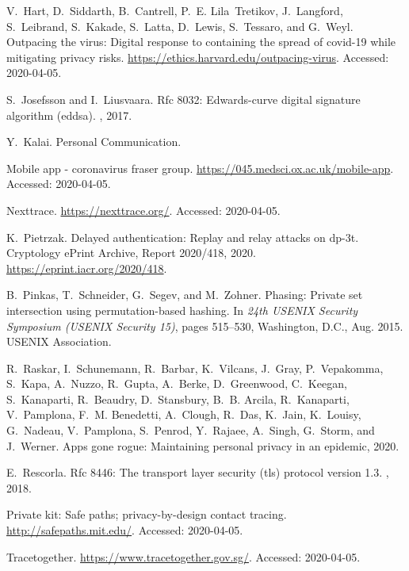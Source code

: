 \begin{thebibliography}{10}
V.~Hart, D.~Siddarth, B.~Cantrell, P.~E. Lila~Tretikov, J.~Langford,
  S.~Leibrand, S.~Kakade, S.~Latta, D.~Lewis, S.~Tessaro, and G.~Weyl.
\newblock Outpacing the virus: Digital response to containing the spread of
  covid-19 while mitigating privacy risks.
\newblock \url{https://ethics.harvard.edu/outpacing-virus}.
\newblock Accessed: 2020-04-05.

S.~Josefsson and I.~Liusvaara.
\newblock Rfc 8032: Edwards-curve digital signature algorithm (eddsa).
, 2017.

Y.~Kalai.
\newblock Personal Communication.

Mobile app - coronavirus fraser group.
\newblock \url{https://045.medsci.ox.ac.uk/mobile-app}.
\newblock Accessed: 2020-04-05.

Nexttrace.
\newblock \url{https://nexttrace.org/}.
\newblock Accessed: 2020-04-05.

K.~Pietrzak.
\newblock Delayed authentication: Replay and relay attacks on dp-3t.
\newblock Cryptology ePrint Archive, Report 2020/418, 2020.
\newblock \url{https://eprint.iacr.org/2020/418}.

B.~Pinkas, T.~Schneider, G.~Segev, and M.~Zohner.
\newblock Phasing: Private set intersection using permutation-based hashing.
\newblock In {\em 24th {USENIX} Security Symposium ({USENIX} Security 15)},
  pages 515--530, Washington, D.C., Aug. 2015. {USENIX} Association.

R.~Raskar, I.~Schunemann, R.~Barbar, K.~Vilcans, J.~Gray, P.~Vepakomma,
  S.~Kapa, A.~Nuzzo, R.~Gupta, A.~Berke, D.~Greenwood, C.~Keegan, S.~Kanaparti,
  R.~Beaudry, D.~Stansbury, B.~B. Arcila, R.~Kanaparti, V.~Pamplona, F.~M.
  Benedetti, A.~Clough, R.~Das, K.~Jain, K.~Louisy, G.~Nadeau, V.~Pamplona,
  S.~Penrod, Y.~Rajaee, A.~Singh, G.~Storm, and J.~Werner.
\newblock Apps gone rogue: Maintaining personal privacy in an epidemic, 2020.

E.~Rescorla.
\newblock Rfc 8446: The transport layer security (tls) protocol version 1.3.
, 2018.

Private kit: Safe paths; privacy-by-design contact tracing.
\newblock \url{http://safepaths.mit.edu/}.
\newblock Accessed: 2020-04-05.

Tracetogether.
\newblock \url{https://www.tracetogether.gov.sg/}.
\newblock Accessed: 2020-04-05.


\end{thebibliography}
